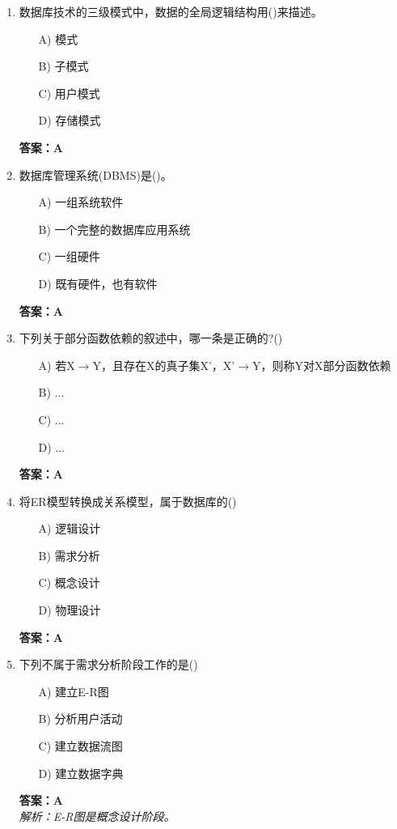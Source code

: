 \documentclass[a4paper,12pt]{article}
\begin{document}
\begin{enumerate}[label=\arabic*.]
\item 数据库技术的三级模式中，数据的全局逻辑结构用()来描述。
\begin{itemize}
    \item[A)] 模式
    \item[B)] 子模式
    \item[C)] 用户模式
    \item[D)] 存储模式
\end{itemize}
\textbf{答案：A}

\item 数据库管理系统(DBMS)是()。
\begin{itemize}
    \item[A)] 一组系统软件
    \item[B)] 一个完整的数据库应用系统
    \item[C)] 一组硬件
    \item[D)] 既有硬件，也有软件
\end{itemize}
\textbf{答案：A}

\item 下列关于部分函数依赖的叙述中，哪一条是正确的?()
\begin{itemize}
    \item[A)] 若X$\to$Y，且存在X的真子集X'，X'$\to$Y，则称Y对X部分函数依赖
    \item[B)] ...
    \item[C)] ...
    \item[D)] ...
\end{itemize}
\textbf{答案：A}

\item 将ER模型转换成关系模型，属于数据库的()
\begin{itemize}
    \item[A)] 逻辑设计
    \item[B)] 需求分析
    \item[C)] 概念设计
    \item[D)] 物理设计
\end{itemize}
\textbf{答案：A}

\item 下列不属于需求分析阶段工作的是()
\begin{itemize}
    \item[A)] 建立E-R图
    \item[B)] 分析用户活动
    \item[C)] 建立数据流图
    \item[D)] 建立数据字典
\end{itemize}
\textbf{答案：A} \\
\textit{解析：E-R图是概念设计阶段。}


\end{enumerate}
\end{document}
